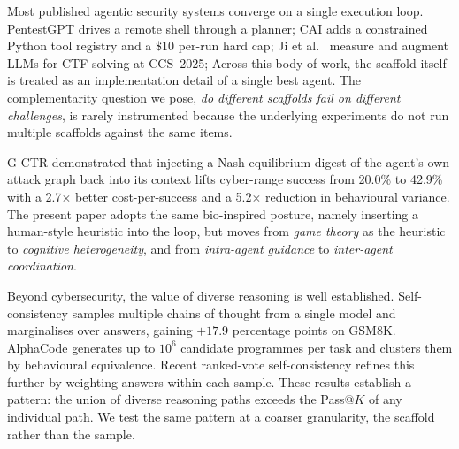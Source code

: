 Most published agentic security systems converge on a single execution loop. PentestGPT \cite{deng2024pentestgpt} drives a remote shell through a planner; CAI \cite{mayoral2025cai} adds a constrained Python tool registry and a $\$10$ per-run hard cap; Ji et al.\ \cite{ctfagent2025} measure and augment LLMs for CTF solving at CCS~2025; 
Across this body of work, the scaffold itself is treated as an implementation detail of a single best agent. The complementarity question we pose, \emph{do different scaffolds fail on different challenges}, is rarely instrumented because the underlying experiments do not run multiple scaffolds against the same items.

G-CTR \cite{mayoralvilches2025gametheoretic} demonstrated that injecting a Nash-equilibrium digest of the agent's own attack graph back into its context lifts cyber-range success from 20.0\% to 42.9\% with a 2.7$\times$ better cost-per-success and a 5.2$\times$ reduction in behavioural variance. The present paper adopts the same bio-inspired posture, namely inserting a human-style heuristic into the loop, but moves from \emph{game theory} as the heuristic to \emph{cognitive heterogeneity}, and from \emph{intra-agent guidance} to \emph{inter-agent coordination}.

Beyond cybersecurity, the value of diverse reasoning is well established. Self-consistency \cite{wang2023selfconsistency} samples multiple chains of thought from a single model and marginalises over answers, gaining $+17.9$ percentage points on GSM8K. AlphaCode \cite{li2022alphacode} generates up to $10^6$ candidate programmes per task and clusters them by behavioural equivalence. Recent ranked-vote self-consistency \cite{rankedvoting2025} refines this further by weighting answers within each sample. These results establish a pattern: the union of diverse reasoning paths exceeds the Pass@$K$ of any individual path. We test the same pattern at a coarser granularity, the scaffold rather than the sample.

